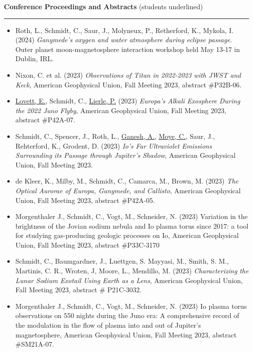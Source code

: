 \documentclass[12pt]{report}
\begin{document}
\vspace{2 mm}
\noindent\textbf{Conference Proceedings and Abstracts} (students underlined) \rm\hspace*{\fill} \\
\rule{\textwidth}{1pt}
 \begin{itemize} \itemsep -2pt %
   \item Roth, L., Schmidt, C., Saur, J., Molyneux, P., Retherford, K., Mykola, I. (2024) \textit{Ganymede's oxygen and water atmosphere during eclipse passage.} Outer planet moon-magnetosphere interaction workshop held May 13-17 in Dublin, IRL.
   \item Nixon, C. et al. (2023) \textit{Observations of Titan in 2022-2023 with JWST and Keck}, American Geophysical Union, Fall Meeting 2023, abstract \#P32B-06.
   \item \underline{Lovett, E.}, Schmidt, C., \underline{Lierle, P.} (2023) \textit{Europa's Alkali Exosphere During the 2022 Juno Flyby}, American Geophysical Union, Fall Meeting 2023, abstract \#P42A-07.
   \item Schmidt, C., Spencer, J., Roth, L., \underline{Ganesh, A.}, \underline{Moye, C.}, Saur, J., Rehterford, K., Grodent, D. (2023) \textit{Io's Far Ultraviolet Emissions Surrounding its Passage through Jupiter's Shadow}, American Geophysical Union, Fall Meeting 2023.
   \item de Kleer, K., Milby, M., Schmidt, C., Camarca, M., Brown, M. (2023) \textit{The Optical Aurorae of Europa, Ganymede, and Callisto}, American Geophysical Union, Fall Meeting 2023, abstract \#P42A-05.
   \item Morgenthaler J., Schmidt, C., Vogt, M., Schneider, N. (2023) Variation in the brightness of the Jovian sodium nebula and Io plasma torus since 2017: a tool for studying gas-producing geologic processes on Io, American Geophysical Union, Fall Meeting 2023, abstract \#P33C-3170
   \item Schmidt, C., Baumgardner, J., Luettgen, S. Mayyasi, M., Smith, S. M., Martinis, C. R., Wroten, J, Moore, L., Mendillo, M. (2023) \textit{Characterizing the Lunar Sodium Exotail Using Earth as a Lens}, American Geophysical Union, Fall Meeting 2023, abstract \# P21C-3032.
   \item Morgenthaler J., Schmidt, C., Vogt, M., Schneider, N. (2023) Io plasma torus observations on 550 nights during the Juno era: A comprehensive record of the modulation in the flow of plasma into and out of Jupiter's magnetosphere, American Geophysical Union, Fall Meeting 2023, abstract \#SM21A-07.

\end{itemize}
\end{document}
